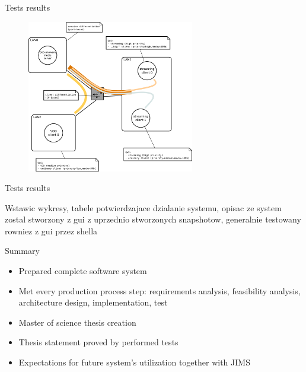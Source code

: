 \documentclass{beamer}
\begin{document}
	\begin{frame}{Tests results}
		
		\begin{figure}
		   \includegraphics[width=0.65\textwidth]{img/diagram.pdf}
		\end{figure}

	\end{frame}

	\begin{frame}{Tests results}
		
		Wstawic wykresy, tabele potwierdzajace dzialanie systemu, opisac ze system zostal stworzony z gui z uprzednio stworzonych snapshotow, generalnie testowany rowniez z gui przez shella

	\end{frame}

	\begin{frame}{Summary}

		
		\begin{itemize}
			\item Prepared complete software system 
			\item Met every production process step: requirements analysis, feasibility analysis, architecture design, implementation, test
			\item Master of science thesis creation
			\item Thesis statement proved by performed tests
			\item Expectations for future system's utilization together with JIMS
		\end{itemize}

	\end{frame}
\end{document}
